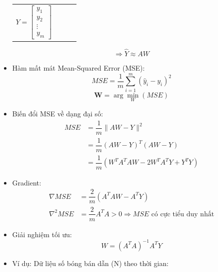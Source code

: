 \documentclass[final,letterpaper,twoside,12pt]{report}
\begin{document}
\begin{itemize}
\begin{center}
\begin{tabular}{cccc}
			      $Y = \begin{bmatrix} y_1 \\ y_2 \\ \vdots \\ y_m \end{bmatrix}$
		      \end{tabular}
	      \end{center}
	      $$\Rightarrow \hat{Y} \approx AW$$
	\item Hàm mất mát Mean-Squared Error (MSE):
	      $$
		      MSE = \dfrac{1}{m} \sum_{i=1}^m(\hat{y}_i - y_i)^2
	      $$
	      $$
		      \mathbf{W} = \arg \min_W(MSE)
	      $$
	\item Biến đổi MSE về dạng đại số:
	      \begin{align*}
		      MSE & = \dfrac{1}{m} \| AW - Y \|^2               \\
		          & = \dfrac{1}{m} (AW - Y)^T(AW - Y)           \\
		          & = \dfrac{1}{m} (W^TA^TAW - 2W^TA^TY + Y^TY)
	      \end{align*}
	\item Gradient:
	      \begin{align*}
		      \nabla MSE   & = \dfrac{2}{m}(A^TAW - A^TY)                                        \\
		      \nabla^2 MSE & = \dfrac{2}{m}A^TA > 0 \Rightarrow MSE \text{ có cực tiểu duy nhất}
	      \end{align*}
	\item Giải nghiệm tối ưu:
	      $$
		      W = (A^TA)^{-1}A^TY
	      $$
	\item Ví dụ: Dữ liệu số bóng bán dẫn (N) theo thời gian:


\end{itemize}
\end{document}
